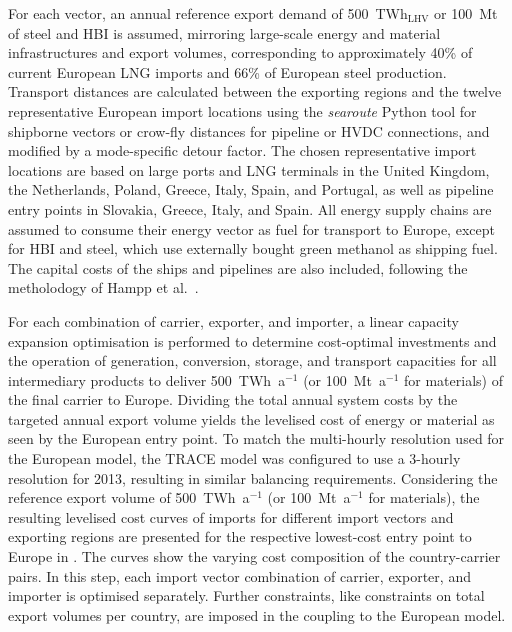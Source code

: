 For each vector, an annual reference export demand of 500~TWh$_\text{LHV}$ or
100~Mt of steel and HBI is assumed, mirroring large-scale energy and material
infrastructures and export volumes, corresponding to approximately 40\% of
current European LNG
imports\cite{instituteforenergyeconomicsandfinancialanalysisEuropeanLNG2023} and
66\% of European steel
production.\cite{eurofer-theeuropeansteelassociationEuropeanSteel2023} Transport
distances are calculated between the exporting regions and the twelve
representative European import locations using the \textit{searoute} Python
tool\cite{haliliSeaRoutePython2024} for shipborne vectors or crow-fly distances
for pipeline or HVDC connections, and modified by a mode-specific detour factor.
The chosen representative import locations are based on large ports and LNG
terminals in the United Kingdom, the Netherlands, Poland, Greece, Italy, Spain,
and Portugal, as well as pipeline entry points in Slovakia, Greece, Italy, and
Spain. All energy supply chains are assumed to consume their energy vector as
fuel for transport to Europe, except for HBI and steel, which use externally
bought green methanol as shipping fuel. The capital costs of the ships and
pipelines are also included, following the metholodogy of Hampp et
al.~\cite{hamppImportOptions2023}.


For each combination of carrier, exporter, and importer, a linear capacity
expansion optimisation is performed to determine cost-optimal investments and
the operation of generation, conversion, storage, and transport capacities for
all intermediary products to deliver 500~TWh~a$^{-1}$ (or 100~Mt~a$^{-1}$ for
materials) of the final carrier to Europe. Dividing the total annual system
costs by the targeted annual export volume yields the levelised cost of energy
or material as seen by the European entry point. To match the multi-hourly
resolution used for the European model, the TRACE model was configured to use a
3-hourly resolution for 2013, resulting in similar balancing requirements.
Considering the reference export volume of 500~TWh~a$^{-1}$ (or 100~Mt~a$^{-1}$
for materials), the resulting levelised cost curves of imports for different
import vectors and exporting regions are presented for the respective
lowest-cost entry point to Europe in
.
The curves show the varying cost composition of the country-carrier pairs. In
this step, each import vector combination of carrier, exporter, and importer is
optimised separately. Further constraints, like constraints on total export
volumes per country, are imposed in the coupling to the European model.

